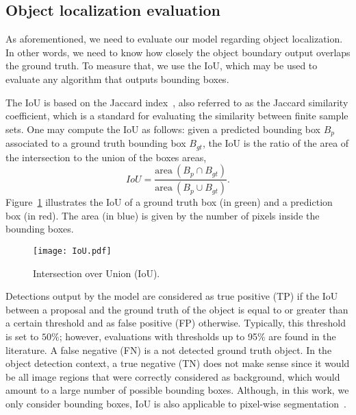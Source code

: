 \subsection{Object localization evaluation}
%
As aforementioned, we need to evaluate our model regarding object localization.
In other words, we need to know how closely the object boundary output overlaps the ground truth.
To measure that, we use the IoU,
which may be used to evaluate any algorithm that outputs bounding boxes.

The IoU is based on the Jaccard index~\cite{jaccard1912distribution}, also referred to as the Jaccard similarity coefficient, which is a standard for evaluating the similarity between finite sample sets.
One may compute the IoU as follows: given a predicted bounding box $B_{p}$ associated to a ground truth bounding box $B_{gt}$, the IoU is the ratio of the area of the intersection to the union of the boxes areas,
%
\begin{equation}
 IoU = \frac{\textrm{area}~(B_p \cap B_{gt})}{\textrm{area}~(B_p \cup B_{gt})}
 \label{eq:IoU}.
\end{equation}
%
Figure~\ref{fig:IoU} illustrates the IoU of a ground truth box (in green) and a prediction box (in red).
The area (in blue) is given by the number of pixels inside the bounding boxes.
%
\begin{figure}[htb]
	\centering
	\texttt{[image: IoU.pdf]}
	\caption{Intersection over Union (IoU).}
	\label{fig:IoU}
\end{figure}

Detections output by the model are considered as true positive (TP) 
if the IoU between a proposal and the ground truth of the object is equal to or greater than a certain threshold and as false positive (FP) 
otherwise. Typically, this threshold is set to $50\%$; however, evaluations with thresholds up to 95\% are found in the literature.
A false negative (FN)  is a not detected ground truth object.
In the object detection context, a true negative (TN)  does not make sense since it would be all image regions that were
correctly considered as background, which would amount to a large number of possible bounding boxes.
Although, in this work, we only consider bounding boxes, IoU is also applicable to pixel-wise segmentation~\cite{He2017mask}.

